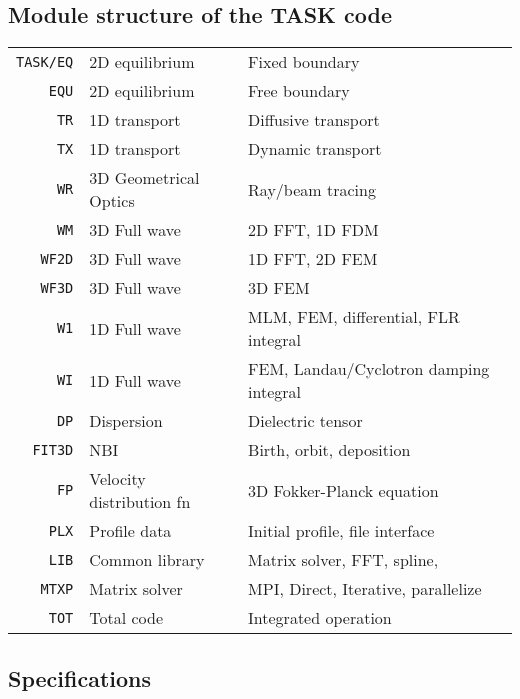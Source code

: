 \documentclass[11pt]{article}
\begin{document}
\subsection{Module structure of the TASK code}
\begin{center}
\begin{tabular}{r|ll}
\hline
\texttt{TASK/EQ} & {2D equilibrium} & Fixed boundary \\
\texttt{EQU} & {2D equilibrium} & Free boundary \\[2mm]
\texttt{TR} & {1D transport} & Diffusive transport \\
\texttt{TX} & {1D transport} & Dynamic transport \\[2mm]
\texttt{WR} & {3D Geometrical Optics} & Ray/beam tracing \\
\texttt{WM} & {3D Full wave} & 2D FFT, 1D FDM \\
\texttt{WF2D} & {3D Full wave} & 1D FFT, 2D FEM \\
\texttt{WF3D} & {3D Full wave} & 3D FEM \\
\texttt{W1} & {1D Full wave} & MLM, FEM, differential, FLR integral \\
\texttt{WI} & {1D Full wave} & FEM, Landau/Cyclotron damping integral \\
\texttt{DP} & {Dispersion} & Dielectric tensor \\[2mm]
\texttt{FIT3D} & {NBI} & Birth, orbit, deposition \\[2mm]
\texttt{FP} & {Velocity distribution fn} & 3D Fokker-Planck equation \\[2mm]
\texttt{PLX} & {Profile data} & Initial profile, file interface \\
\texttt{LIB} & {Common library} & Matrix solver, FFT, spline,  \\
\texttt{MTXP} & {Matrix solver} & MPI, Direct, Iterative, parallelize \\
\texttt{TOT} & {Total code} & Integrated operation \\
\hline
\end{tabular}
\end{center}

\subsection{Specifications}
\end{document}
